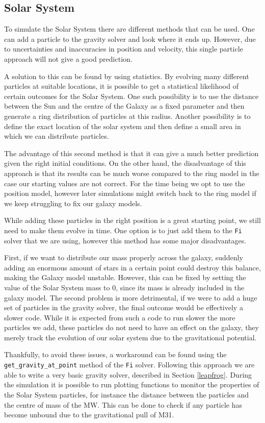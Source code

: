 \documentclass[a4paper,12pt, english]{article}
\begin{document}
\subsection{Solar System}
\label{solar-system}
To simulate the Solar System there are different methods that can be used. One can add a particle to the gravity solver and look where it ends up. However, due to uncertainties and inaccuracies in position and velocity, this single particle approach will not give a good prediction.\par
\smallskip
A solution to this can be found by using statistics. By evolving many different particles at suitable locations, it is possible to get a statistical likelihood of certain outcomes for the Solar System. One such possibility is to use the distance between the Sun and the centre of the Galaxy as a fixed parameter and then generate a ring distribution of particles at this radius. Another possibility is to define the exact location of the solar system and then define a small area in which we can distribute particles.\par
\smallskip
The advantage of this second method is that it can give a much better prediction given the right initial conditions. On the other hand, the disadvantage of this approach is that its results can be much worse compared to the ring model in the case our starting values are not correct. For the time being we opt to use the position model, however later simulations might switch back to the ring model if we keep struggling to fix our galaxy models.\par
\smallskip
While adding these particles in the right position is a great starting point, we still need to make them evolve in time. One option is to just add them to the \texttt{Fi} solver that we are using, however this method has some major disadvantages.\par
\smallskip
First, if we want to distribute our mass properly across the galaxy, suddenly adding an enormous amount of stars in a certain point could destroy this balance, making the Galaxy model unstable. However, this can be fixed by setting the value of the Solar System mass to 0, since its mass is already included in the galaxy model. The second problem is more detrimental, if we were to add a huge set of particles in the gravity solver, the final outcome would be effectively a slower code. While it is expected from such a code to run slower the more particles we add, these particles do not need to have an effect on the galaxy, they merely track the evolution of our solar system due to the gravitational potential.\par
\smallskip
Thankfully, to avoid these issues, a workaround can be found using the \texttt{get\_gravity\_at\_point} method of the \texttt{Fi} solver. Following this approach we are able to write a very basic gravity solver, described in Section \ref{leapfrog}. During the simulation it is possible to run plotting functions to monitor the properties of the Solar System particles, for instance the distance between the particles and the centre of mass of the MW. This can be done to check if any particle has become unbound due to the gravitational pull of M31.\par
\smallskip
\end{document}
